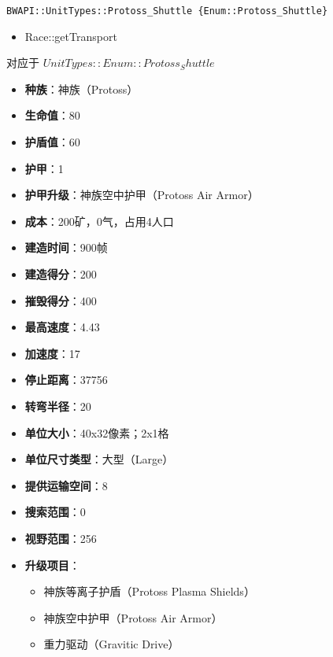 \begin{tcolorbox}[colback=white, colframe=black!60!white, title=Protoss\_Shuttle(), arc=0mm]
    \begin{verbatim}
BWAPI::UnitTypes::Protoss_Shuttle {Enum::Protoss_Shuttle}
    \end{verbatim}
    \begin{refer}
        \begin{itemize}
            \item Race::getTransport
        \end{itemize}
    \end{refer}
    对应于  $ UnitTypes::Enum::Protoss_Shuttle $ 
    \begin{itemize}
        \item \textbf{种族}：神族（Protoss）
        \item \textbf{生命值}：80
        \item \textbf{护盾值}：60
        \item \textbf{护甲}：1
        \item \textbf{护甲升级}：神族空中护甲（Protoss Air Armor）
        \item \textbf{成本}：200矿，0气，占用4人口
        \item \textbf{建造时间}：900帧
        \item \textbf{建造得分}：200
        \item \textbf{摧毁得分}：400
        \item \textbf{最高速度}：4.43
        \item \textbf{加速度}：17
        \item \textbf{停止距离}：37756
        \item \textbf{转弯半径}：20
        \item \textbf{单位大小}：40x32像素；2x1格
        \item \textbf{单位尺寸类型}：大型（Large）
        \item \textbf{提供运输空间}：8
        \item \textbf{搜索范围}：0
        \item \textbf{视野范围}：256
        \item \textbf{升级项目}：
            \begin{itemize}
                \item 神族等离子护盾（Protoss Plasma Shields）
                \item 神族空中护甲（Protoss Air Armor）
                \item 重力驱动（Gravitic Drive）

\end{itemize}
\end{itemize}
\end{tcolorbox}
